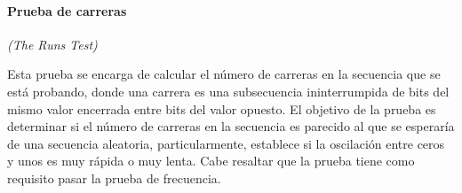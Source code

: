 

\paragraph{Prueba de carreras} %
\textit{(The Runs Test)}


Esta prueba se encarga de calcular el número de carreras en la secuencia que
se está probando, donde una carrera es una subsecuencia ininterrumpida de
bits del mismo valor encerrada entre bits del valor opuesto. El objetivo de
la prueba es determinar si el número de carreras en la secuencia es parecido
al que se esperaría de una secuencia aleatoria, particularmente, establece si
la oscilación entre ceros y unos es muy rápida o muy lenta. Cabe resaltar que
la prueba tiene como requisito pasar la prueba de frecuencia.


